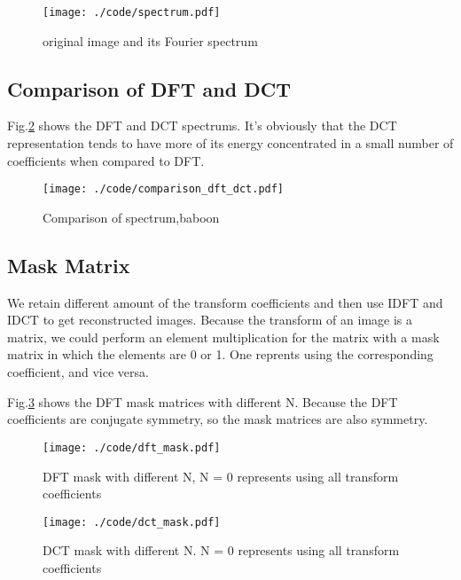 \documentclass[journal,comsoc]{IEEEtran}
\begin{document}
\begin{figure}[!ht]
  \centering
  \captionsetup{justification=centering}
  \texttt{[image: ./code/spectrum.pdf]}
  \caption{original image and its Fourier spectrum}
\label{Fig:spectrum}
\end{figure}

\subsection{Comparison of DFT and DCT}
\label{subsec:comparison-dft-dct}

Fig.\ref{Fig:comparison-spectrum} shows the DFT and DCT spectrums. It's obviously that
the DCT representation tends to have more of its energy concentrated in a small number
of coefficients when compared to DFT.


\begin{figure}[!ht]
  \centering
  \captionsetup{justification=centering}
  \texttt{[image: ./code/comparison\_dft\_dct.pdf]}
  \caption{Comparison of spectrum,baboon}
\label{Fig:comparison-spectrum}
\end{figure}

\subsection{Mask Matrix}
\label{subsec:mask-matrix}

We retain different amount of the transform coefficients and then use IDFT and IDCT
to get reconstructed images. Because the transform of an image is a matrix, we could
perform an element multiplication for the matrix with a mask matrix in which the
elements are 0 or 1. One reprents using the corresponding coefficient, and vice versa.

Fig.\ref{Fig:dft-mask} shows the DFT mask matrices with different N. Because the
DFT coefficients are conjugate symmetry, so the mask matrices are also symmetry.

\begin{figure}[!ht]
  \centering
  \captionsetup{justification=centering}
  \texttt{[image: ./code/dft\_mask.pdf]}
  \caption{DFT mask with different N, N = 0 represents using all transform coefficients}
\label{Fig:dft-mask}
\end{figure}

\begin{figure}[!ht]
  \centering
  \captionsetup{justification=centering}
  \texttt{[image: ./code/dct\_mask.pdf]}
  \caption{DCT mask with different N. N = 0 represents using all transform coefficients}
\label{Fig:dct-mask}
\end{figure}
\end{document}
